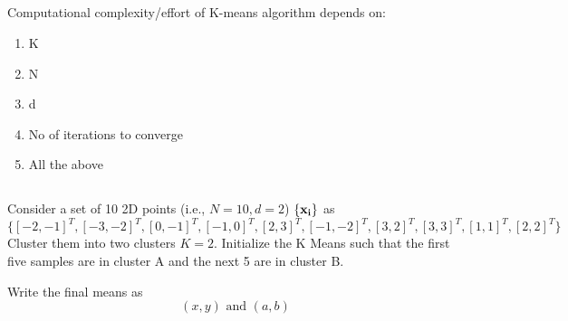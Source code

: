 \begin{frame}
\section{}
Computational complexity/effort of K-means algorithm depends on:
\begin{enumerate}[label=(\Alph*)]
\item K   %
\item N   %
\item d   %
\item No of iterations to converge    %
\item All the above  %
\end{enumerate}
\end{frame}


\begin{frame}
\section{}
Consider a set of 10 2D points (i.e., $N=10, d=2$) $\{{\bf x_i}\}$ as
\[ \{ [-2,-1]^T, [-3,-2]^T, [0, -1]^T, [-1,0]^T, [2,3]^T, [-1,-2]^T, [3,2]^T, [3,3]^T, [1,1]^T, [2,2]^T \} \]
Cluster them into two clusters $K=2$. Initialize the K Means such that the first five samples are in cluster A and the
next 5 are in cluster B.

Write the final means as
\[ (x,y) \mbox{ and } (a,b) \]
\end{frame}
